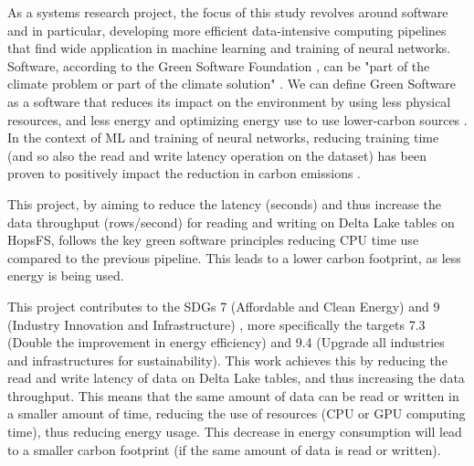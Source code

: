 As a systems research project, the focus of this study revolves around software and in particular, developing more efficient data-intensive computing pipelines that find wide application in machine learning and training of neural networks. Software, according to the Green Software Foundation \cite{GreenSoftwareFoundation}, can be "part of the climate problem or part of the climate solution" \cite{WhatGreenSoftware2021}. We can define Green Software as a software that reduces its impact on the environment by using less physical resources, and less energy and optimizing energy use to use lower-carbon sources \cite{WhatGreenSoftware2021}. In the context of \gls{ML} and training of neural networks, reducing training time (and so also the read and write latency operation on the dataset) has been proven to positively impact the reduction in carbon emissions \cite{pattersonCarbonEmissionsLarge2021,pattersonCarbonFootprintMachine2022}.

This project, by aiming to reduce the latency (seconds) and thus increase the data throughput (rows/second) for reading and writing on Delta Lake tables on \gls{HopsFS}, follows the key green software principles reducing \gls{CPU} time use compared to the previous pipeline. This leads to a lower carbon footprint, as less energy is being used.

This project contributes to the \glspl{SDG} 7 (Affordable and Clean Energy) and 9 (Industry Innovation and Infrastructure) \cite{SustainableDevelopment}, more specifically the targets 7.3 (Double the improvement in energy efficiency) and 9.4 (Upgrade all industries and infrastructures for sustainability). This work achieves this by reducing the read and write latency of data on Delta Lake tables, and thus increasing the data throughput. This means that the same amount of data can be read or written in a smaller amount of time, reducing the use of resources (\gls{CPU} or \gls{GPU} computing time), thus reducing energy usage. This decrease in energy consumption will lead to a smaller carbon footprint (if the same amount of data is read or written). 

